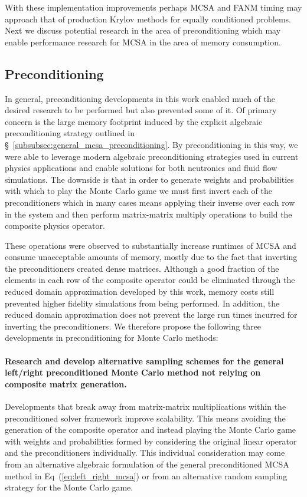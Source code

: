 With these implementation improvements perhaps MCSA and FANM timing
may approach that of production Krylov methods for equally conditioned
problems. Next we discuss potential research in the area of
preconditioning which may enable performance research for MCSA in the
area of memory consumption.

\subsection{Preconditioning}
\label{subsec:future_preconditioning}

In general, preconditioning developments in this work enabled much of
the desired research to be performed but also prevented some of it. Of
primary concern is the large memory footprint induced by the explicit
algebraic preconditioning strategy outlined in
\S~\ref{subsubsec:general_mcsa_preconditioning}. By preconditioning in
this way, we were able to leverage modern algebraic preconditioning
strategies used in current physics applications and enable solutions
for both neutronics and fluid flow simulations. The downside is that
in order to generate weights and probabilities with which to play the
Monte Carlo game we must first invert each of the preconditioners
which in many cases means applying their inverse over each row in the
system and then perform matrix-matrix multiply operations to build the
composite physics operator.

These operations were observed to substantially increase runtimes of
MCSA and consume unacceptable amounts of memory, mostly due to the
fact that inverting the preconditioners created dense
matrices. Although a good fraction of the elements in each row of the
composite operator could be eliminated through the reduced domain
approximation developed by this work, memory costs still prevented
higher fidelity simulations from being performed. In addition, the
reduced domain approximation does not prevent the large run times
incurred for inverting the preconditioners. We therefore propose the
following three developments in preconditioning for Monte Carlo
methods:

\paragraph{\textbf{Research and develop alternative sampling schemes for
  the general left/right preconditioned Monte Carlo method not relying
  on composite matrix generation.}} Developments that break away from
matrix-matrix multiplications within the preconditioned solver
framework improve scalability. This means avoiding the generation of
the composite operator and instead playing the Monte Carlo game with
weights and probabilities formed by considering the original linear
operator and the preconditioners individually. This individual
consideration may come from an alternative algebraic formulation of
the general preconditioned MCSA method in
Eq~(\ref{eq:left_right_mcsa}) or from an alternative random sampling
strategy for the Monte Carlo game.

